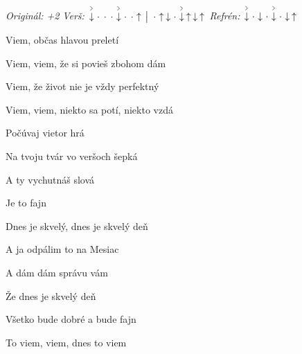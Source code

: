 \begin{song}


\begin{headerbox}
\RaiseBoxWithAccents
\textit{Originál: +2} \quad
\textit{Verš:} $\AccentDown\Miss\Miss\Miss\AccentDown\Miss\Miss\Up \Separator \Miss\Up\Down\Miss\AccentDown\Up\Down\Up$ \quad
\textit{Refrén:} $\AccentDown\Miss\Down\Miss\AccentDown\Miss\Down\Up$
\end{headerbox}

\begin{hchordbox}
\end{hchordbox}

\Large

\bigskip

 Viem, občas hlavou preletí \par
Viem, viem, že si povieš zbohom dám  \par
{} Viem, že život nie je vždy perfektný \par
Viem, viem, niekto sa potí, niekto vzdá  \par

\bigskip

\begin{chorusbox}{\PredrefrenARefren}
Počúvaj vietor hrá  \par
{}Na tvoju tvár vo veršoch šepká \par
A ty vychutnáš slová \par
Je to fajn \par

\bigskip

Dnes je skvelý, dnes je skvelý deň \par
A ja odpálim to na Mesiac \par
A dám dám správu vám \par

\bigskip

Že dnes je skvelý deň \par
Všetko bude dobré a bude fajn \par
To viem, viem, dnes to viem \par
\end{chorusbox}


\end{song}
